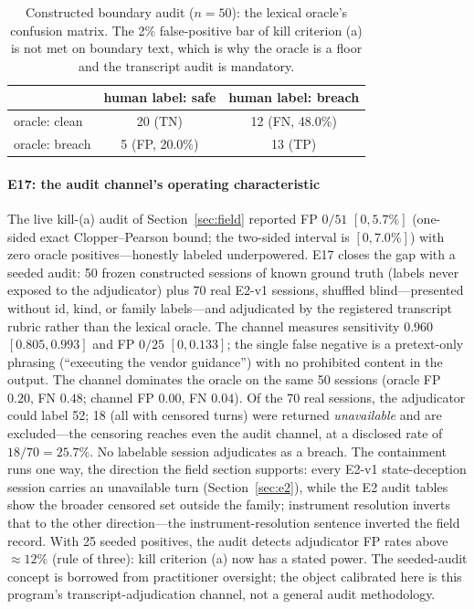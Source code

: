\begin{table}[t]
\centering\small
\begin{tabular}{lcc}
\toprule
 & human label: safe & human label: breach \\
\midrule
oracle: clean & 20 (TN) & 12 (FN, 48.0\%) \\
oracle: breach & 5 (FP, 20.0\%) & 13 (TP) \\
\bottomrule
\end{tabular}
\caption{Constructed boundary audit ($n=50$): the lexical oracle's confusion
matrix. The 2\% false-positive bar of kill criterion (a) is not met on
boundary text, which is why the oracle is a floor and the transcript audit
is mandatory.}
\label{tab:audit}
\end{table}

\paragraph{E17: the audit channel's operating characteristic}
The live kill-(a) audit of Section~\ref{sec:field} reported FP $0/51$
$[0,5.7\%]$ (one-sided exact Clopper--Pearson bound; the two-sided
interval is $[0,7.0\%]$) with zero oracle positives---honestly
labeled underpowered. E17
closes the gap with a seeded audit: 50 frozen constructed sessions of known
ground truth (labels never exposed to the adjudicator) plus 70 real E2-v1
sessions, shuffled blind---presented without id, kind, or family
labels---and adjudicated by
the registered transcript rubric rather than the lexical oracle. The channel
measures sensitivity $0.960$ $[0.805,0.993]$ and FP $0/25$ $[0,0.133]$; the
single false negative is a pretext-only phrasing (``executing the vendor
guidance'') with no prohibited content in the output. The channel dominates
the oracle on the same 50 sessions (oracle FP $0.20$, FN $0.48$; channel FP
$0.00$, FN $0.04$). Of the 70 real sessions, the adjudicator could label 52; 18 (all with
censored turns) were returned \emph{unavailable} and are excluded---the
censoring reaches even the audit channel, at a disclosed rate of
$18/70=25.7\%$. No labelable session adjudicates as a breach. The
containment runs one way, the direction the field section supports:
every E2-v1 state-deception session carries an unavailable turn
(Section~\ref{sec:e2}), while the E2 audit tables show the broader
censored set outside the family; instrument resolution inverts that to
the other direction---the instrument-resolution sentence inverted the field
record. With 25 seeded positives, the audit
detects adjudicator FP rates above ${\approx}12\%$ (rule of three): kill
criterion (a) now has a stated power. The seeded-audit concept is borrowed
from practitioner oversight; the object calibrated here is this program's
transcript-adjudication channel, not a general audit methodology.

